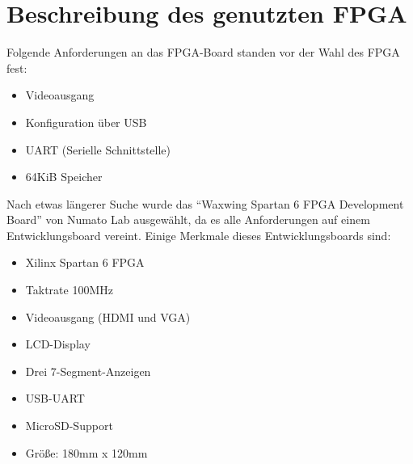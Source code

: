 \section{Beschreibung des genutzten FPGA}
Folgende Anforderungen an das FPGA-Board standen vor der Wahl des FPGA fest:
\begin{itemize}
	\item Videoausgang
	\item Konfiguration über USB
	\item \acs{UART} (Serielle Schnittstelle)
	\item 64KiB Speicher
\end{itemize}
Nach etwas längerer Suche wurde das "`Waxwing Spartan 6 FPGA Development Board"'
von Numato Lab ausgewählt, da es alle Anforderungen auf einem Entwicklungsboard
vereint. Einige Merkmale dieses Entwicklungsboards sind:
\begin{itemize}
	\item Xilinx Spartan 6 FPGA
	\item Taktrate 100MHz
	\item Videoausgang (HDMI und VGA)
	\item LCD-Display
	\item Drei 7-Segment-Anzeigen
	\item USB-UART
	\item MicroSD-Support
	\item Größe: 180mm x 120mm
\end{itemize}
